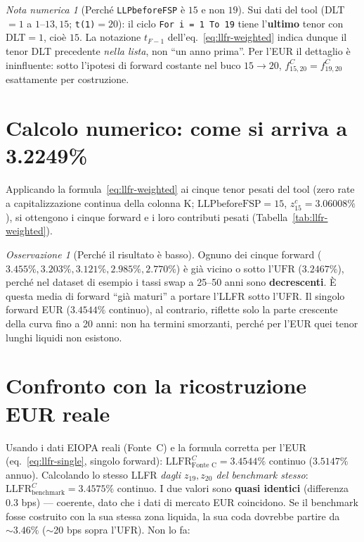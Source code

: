 \documentclass[11pt,a4paper]{article}
\theoremstyle{definition}
\theoremstyle{remark}
\newtheorem*{osservazione}{Osservazione}
\newtheorem*{attenzione}{Nota numerica}
\newcommand{\UFR}{\mathrm{UFR}}
\newcommand{\LLFR}{\mathrm{LLFR}}
\begin{document}
\begin{attenzione}[Perché \texttt{LLPbeforeFSP} \`e $15$ e non $19$]
\label{oss:tf-1}
Sui dati del tool (DLT$=1$ a $1$--$13,15$; \texttt{t(1)}$=20$): il ciclo
\texttt{For i = 1 To 19} tiene l'\textbf{ultimo} tenor con DLT$=1$, cio\`e $15$. La notazione
$t_{F-1}$ dell'eq.~\eqref{eq:llfr-weighted} indica dunque il tenor DLT precedente
\emph{nella lista}, non ``un anno prima''. Per l'EUR il dettaglio \`e ininfluente: sotto
l'ipotesi di forward costante nel buco $15\!\to\!20$, $f^C_{15,20}=f^C_{19,20}$ esattamente
per costruzione.
\end{attenzione}

\section{Calcolo numerico: come si arriva a 3.2249\%}
\label{sec:calcolo}

Applicando la formula~\eqref{eq:llfr-weighted} ai cinque tenor pesati del tool (zero rate a
capitalizzazione continua della colonna K; $\text{LLPbeforeFSP}=15$, $z^c_{15}=3.06008\%$), si
ottengono i cinque forward e i loro contributi pesati (Tabella~\ref{tab:llfr-weighted}).



\begin{osservazione}[Perché il risultato è basso]
Ognuno dei cinque forward ($3.455\%, 3.203\%, 3.121\%, 2.985\%, 2.770\%$) \`e gi\`a vicino o
sotto l'$\UFR$ ($3.2467\%$), perch\'e nel dataset di esempio i tassi swap a 25--50 anni sono
\textbf{decrescenti}. \`E questa media di forward ``gi\`a maturi'' a portare l'LLFR sotto
l'UFR. Il singolo forward EUR ($3.4544\%$ continuo), al contrario, riflette solo la parte
crescente della curva fino a 20 anni: non ha termini smorzanti, perch\'e per l'EUR quei tenor
lunghi liquidi non esistono.
\end{osservazione}

\section{Confronto con la ricostruzione EUR reale}
\label{sec:confronto-reale}

Usando i dati EIOPA reali (Fonte~C) e la formula corretta per l'EUR
(eq.~\eqref{eq:llfr-single}, singolo forward): $\LLFR^C_{\text{Fonte C}} = 3.4544\%$ continuo
($3.5147\%$ annuo). Calcolando lo stesso LLFR \emph{dagli $z_{19},z_{20}$ del benchmark stesso}:
$\LLFR^C_{\text{benchmark}} = 3.4575\%$ continuo. I due valori sono \textbf{quasi identici}
(differenza $0.3$ bps) --- coerente, dato che i dati di mercato EUR coincidono. Se il benchmark
fosse costruito con la sua stessa zona liquida, la sua coda dovrebbe partire da $\sim3.46\%$
($\sim$20 bps sopra l'UFR). Non lo fa:
\end{document}
